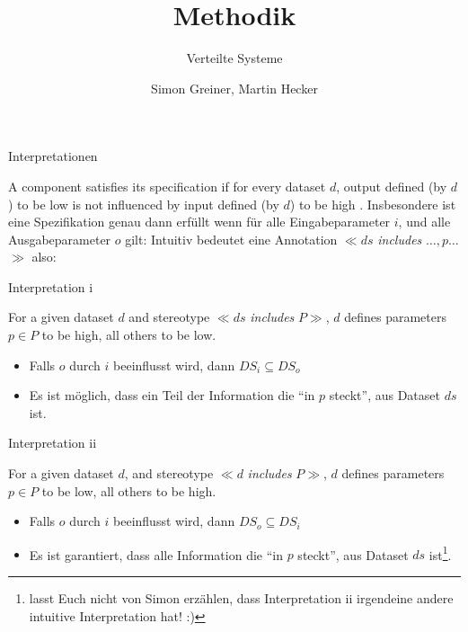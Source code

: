 \documentclass[18pt]{beamer}
\title{Methodik}
\subtitle{Verteilte Systeme}
\author{Simon Greiner, Martin Hecker}
\institute{Kompetenzzentrum für angewandte Sicherheitstechnologie}
\newcommand{\kit}[1]{\textcolor{kit-green100}{#1}}
\newcommand{\stereo}[1]{$\ll$#1$\gg$\xspace}
\newcommand{\includesstereo}[2]{\stereo{$#1$ \emph{includes} $#2$}}
\begin{document}


\AtBeginSection{\frame{\sectionpage}}

\begin{frame}
\titlepage
\end{frame}



\begin{frame}[fragile,t]{Interpretationen}

\begin{overprint}
A component satisfies its specification if for every dataset $d$, output defined (by $d$) to be {\color{blue} low} is not influenced
by input defined (by $d$) to be {\color{red} high} .
Insbesondere ist eine Spezifikation genau dann erfüllt wenn für alle Eingabeparameter $i$, und alle Ausgabeparameter $o$ gilt:
Intuitiv bedeutet eine Annotation \includesstereo{ds}{\ldots, p \ldots} also:
\end{overprint}

\vfill

\kit{Interpretation i}
\begin{overprint}
For a given dataset $d$ and stereotype \includesstereo{ds}{P},
$d$ defines parameters $p \in P$ to be {\color{red} high},  all others to be  {\color{blue} low}.
\begin{itemize}
  \item Falls $o$ durch $i$ beeinflusst wird, dann  $DS_i \subseteq DS_o$
\end{itemize}
\begin{itemize}
  \item Es ist möglich,    dass ein Teil der Information die \enquote{in $p$ steckt}, aus Dataset $ds$ ist.
\end{itemize}
\end{overprint}

\vfill

\kit{Interpretation ii}
\begin{overprint}
For a given dataset $d$, and stereotype \includesstereo{d}{P},
$d$ defines parameters $p \in P$ to be {\color{blue} low},  all others to be  {\color{red} high}.
\begin{itemize}
  \item Falls $o$ durch $i$ beeinflusst wird, dann  $DS_o \subseteq DS_i$
\end{itemize}
\begin{itemize}
   \item Es ist garantiert, dass alle Information         die \enquote{in $p$ steckt}, aus Dataset $ds$ ist\footnote{lasst Euch nicht von Simon erzählen, dass Interpretation ii irgendeine andere intuitive Interpretation hat! :)}.
\end{itemize}
\end{overprint}


\end{frame}
\end{document}
